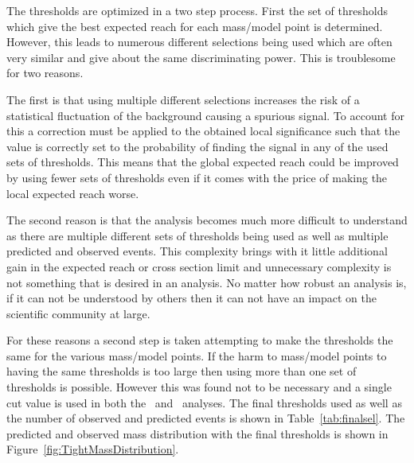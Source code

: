 The thresholds are optimized in a two step process. First the set of thresholds which give the best expected reach for each mass/model point is determined. However, this leads
to numerous different selections being used which are often very similar and give about the same discriminating power. This is troublesome for two reasons. 

The first is that using multiple different selections increases the risk of a statistical fluctuation of the background causing a spurious signal. 
To account for this a correction
must be applied to the obtained local significance such that the value is correctly set to the probability of finding the signal in any of the used sets of thresholds. This
means that the global expected reach could be improved by using fewer sets of thresholds even if it comes with the price of making the local expected reach worse.

The second reason is that the analysis becomes much more difficult to understand as there are multiple different sets of thresholds being used as well as multiple predicted and 
observed events. This complexity brings with it little additional gain in the expected reach or cross section limit and unnecessary complexity is not something that
is desired in an analysis. No matter how robust an analysis is, if it can not be 
understood by others then it can not have an impact on the scientific community at large.

For these reasons a second step is taken attempting to make the thresholds the same for the various mass/model points. If the harm to mass/model points to having the
same thresholds is too large then using more than one set of thresholds is possible. 
However this was found not to be necessary and a single cut value is used in both the \muononly\ and \tktof\ analyses. 
The final thresholds used as well as the number of
observed and predicted events is shown in Table~\ref{tab:finalsel}. The predicted and observed mass distribution with the final thresholds is shown in 
Figure~\ref{fig:TightMassDistribution}.

